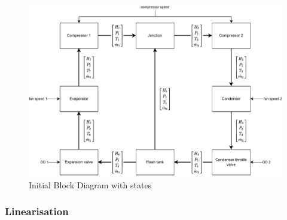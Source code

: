 \begin{figure}[h!]
	\centering
	\includegraphics[width=1\textwidth]{Graphics/Block Diagram.pdf}
	\caption{Initial Block Diagram with states}
	\label{fig:Block_diagram}
\end{figure}



\subsubsection{Linearisation}